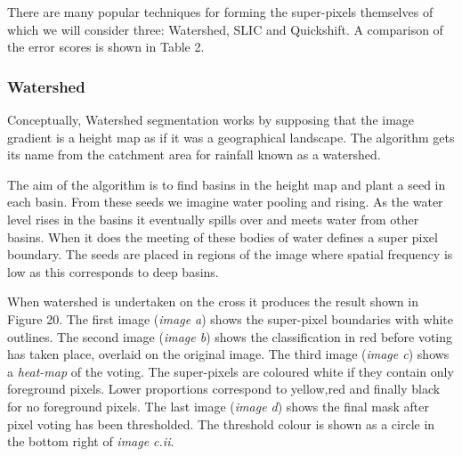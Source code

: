 \documentclass[12pt]{IIBproject}
\begin{document}
There are many popular techniques for forming the super-pixels themselves of which we will consider three: Watershed, SLIC and Quickshift. A comparison of the error scores is shown in Table 2.



\subsubsection{Watershed}
Conceptually, Watershed segmentation works by supposing that the image gradient is a height map as if it was a geographical landscape. The algorithm gets its name from the catchment area for rainfall known as a watershed. 

The aim of the algorithm is to find basins in the height map and plant a seed in each basin. From these seeds we imagine water pooling and rising. As the water level rises in the basins it eventually spills over and meets water from other basins. When it does the meeting of these bodies of water defines a super pixel boundary. The seeds are placed in regions of the image where spatial frequency is low as this corresponds to deep basins.
 
When watershed is undertaken on the cross it produces the result shown in Figure 20. The first image (\emph{image a}) shows the super-pixel boundaries with white outlines. The second image (\emph{image b}) shows the classification in red before voting has taken place, overlaid on the original image. The third image (\emph{image c}) shows a \emph{heat-map} of the voting. The super-pixels are coloured white if they contain only foreground pixels. Lower proportions correspond to yellow,red and finally black for no foreground pixels. The last image (\emph{image d}) shows the final mask after pixel voting has been thresholded. The threshold colour is shown as a circle in the bottom right of \emph{image c.ii}.
\end{document}
